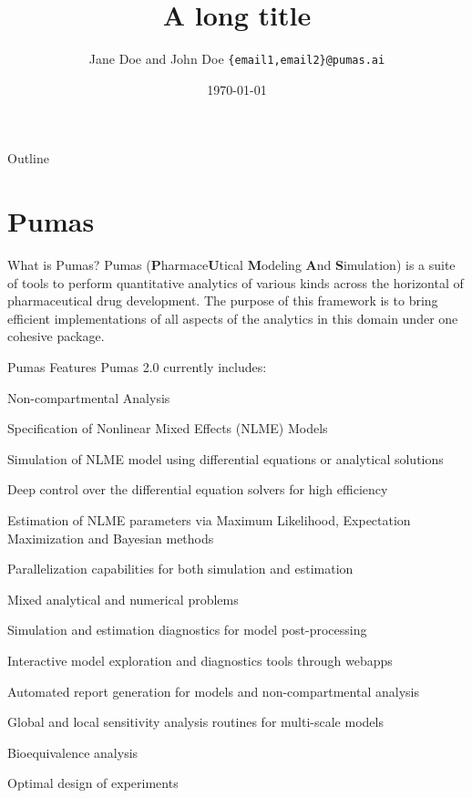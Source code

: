 \documentclass[aspectratio=169]{beamer}                    %
\title[Short Title]{A long title}
\author[\textcolor{pureminimalistic@text@pumasblue}{PumasAI}]{Jane Doe and John Doe \texttt{\{email1,email2\}@pumas.ai}}
\institute{\textcolor{pureminimalistic@text@pumasblue}{PumasAI}}
\date{\today}
\begin{document}
\maketitle

\begin{frame}{Outline}
	\tableofcontents
\end{frame}

\section{Pumas}
\begin{frame}{What is Pumas?}
	Pumas (\textbf{P}harmace\textbf{U}tical \textbf{M}odeling \textbf{A}nd \textbf{S}imulation)
	\parencite{rackauckas2020accelerated}
	is a suite of tools to perform quantitative analytics of various kinds
	across the horizontal of pharmaceutical drug development.
	The purpose of this framework is to bring efficient implementations of
	all aspects of the analytics in this domain under one cohesive package.
\end{frame}

\begin{frame}{Pumas Features}
	Pumas 2.0 currently includes:
	\begin{vfilleditems}
		\small
		\item Non-compartmental Analysis
		\item Specification of Nonlinear Mixed Effects (NLME) Models
		\item Simulation of NLME model using differential equations or analytical solutions
		\item Deep control over the differential equation solvers for high efficiency
		\item Estimation of NLME parameters via Maximum Likelihood, Expectation Maximization and Bayesian methods
		\item Parallelization capabilities for both simulation and estimation
		\item Mixed analytical and numerical problems
		\item Simulation and estimation diagnostics for model post-processing
		\item Interactive model exploration and diagnostics tools through webapps
		\item Automated report generation for models and non-compartmental analysis
		\item Global and local sensitivity analysis routines for multi-scale models
		\item Bioequivalence analysis
		\item Optimal design of experiments
	\end{vfilleditems}
\end{frame}
\end{document}
